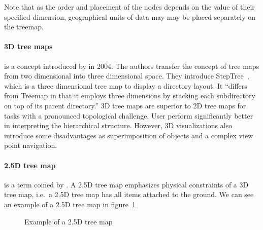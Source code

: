 \documentclass{article}
\newcommand{\tmap}{\textsc{2.5D} tree map}
\newcommand{\threedTmap}{\textsc{3D} tree map}
\newcommand{\threedTmaps}{\textsc{3D} tree maps}
\begin{document}
Note that as the order and placement of the nodes depends on the value of their specified dimension, geographical units of data may may be placed separately on the treemap.

\paragraph{\threedTmaps{}} is a concept introduced by \textcite{Bladh2004} in 2004.
The authors transfer the concept of tree maps from two dimensional into three dimensional space.
They introduce StepTree~\cite{Bladh2004}, which is a three dimensional tree map to display a directory layout.
It ``differs from Treemap in that it employs three dimensions by stacking each subdirectory on top of its parent directory.''
3D tree maps are superior to 2D tree maps for tasks with a pronounced topological challenge.
User perform significantly better in interpreting the hierarchical structure.
However, 3D visualizations also introduce some disadvantages as superimposition of objects and a complex view point navigation.

\paragraph{\tmap{}} is a term coined by \textcite{Limberger2016}.
A \tmap{} emphasizes physical constraints of a \threedTmap{}, i.e.\ a \tmap{} has all items attached to the ground.
We can see an example of a \tmap{} in figure~\ref{fig:research:ua_treemap}

\begin{figure}[h]
  \centering
  \caption{Example of a \tmap{}}\label{fig:research:ua_treemap}
\end{figure}
\end{document}
